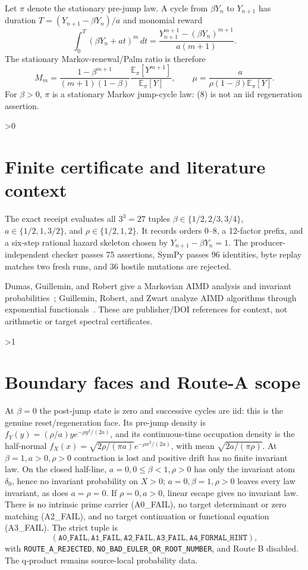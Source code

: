 \documentclass[10pt]{article}
\begin{document}
Let \(\pi\) denote the stationary pre-jump law.  A cycle from \(\beta Y_n\) to
\(Y_{n+1}\) has duration \(T=(Y_{n+1}-\beta Y_n)/a\) and monomial reward
\begin{equation}
 \int_0^T(\beta Y_n+at)^m\,dt
 =\frac{Y_{n+1}^{m+1}-(\beta Y_n)^{m+1}}{a(m+1)}. \tag{8}
\end{equation}
The stationary Markov-renewal/Palm ratio is therefore
\begin{equation}
 M_m=\frac{1-\beta^{m+1}}{(m+1)(1-\beta)}
 \frac{\mathbb E_\pi[Y^{m+1}]}{\mathbb E_\pi[Y]},
 \qquad
 \mu=\frac{a}{\rho(1-\beta)\mathbb E_\pi[Y]}. \tag{9}
\end{equation}
For \(\beta>0\), \(\pi\) is a stationary Markov jump-cycle law: (8) is not an
iid regeneration assertion.

\ifnum\CRevisionRound>0
\section{Finite certificate and literature context}
The exact receipt evaluates all \(3^3=27\) tuples
\(\beta\in\{1/2,2/3,3/4\}\), \(a\in\{1/2,1,3/2\}\), and
\(\rho\in\{1/2,1,2\}\).  It records orders 0--8, a 12-factor prefix, and a
six-step rational hazard skeleton chosen by \(Y_{n+1}-\beta Y_n=1\).  The
producer-independent checker passes 75 assertions, SymPy passes 96 identities,
byte replay matches two fresh runs, and 36 hostile mutations are rejected.

Dumas, Guillemin, and Robert give a Markovian AIMD analysis and invariant
probabilities~\cite{dumas2002}; Guillemin, Robert, and Zwart analyze AIMD
algorithms through exponential functionals~\cite{guillemin2004}.  These are
publisher/DOI references for context, not arithmetic or target spectral
certificates.
\fi

\ifnum\CRevisionRound>1
\section{Boundary faces and Route-A scope}
At \(\beta=0\) the post-jump state is zero and successive cycles are iid: this
is the genuine reset/regeneration face.  Its pre-jump density is
\(f_Y(y)=(\rho/a)y e^{-\rho y^2/(2a)}\), and its continuous-time occupation
density is the half-normal
\(f_X(x)=\sqrt{2\rho/(\pi a)}e^{-\rho x^2/(2a)}\), with mean
\(\sqrt{2a/(\pi\rho)}\).  At \(\beta=1,a>0,\rho>0\) contraction is lost and
positive drift has no finite invariant law.  On the closed half-line,
\(a=0,0\le\beta<1,\rho>0\) has only the invariant atom \(\delta_0\), hence no
invariant probability on \(X>0\); \(a=0,\beta=1,\rho>0\) leaves every law
invariant, as does \(a=\rho=0\).  If \(\rho=0,a>0\), linear escape gives no
invariant law.  There is no intrinsic prime carrier (A0\_FAIL),
no target determinant or zero matching (A2\_FAIL), and no target continuation
or functional equation (A3\_FAIL).  The strict tuple is
\[
(\mathtt{A0\_FAIL},\mathtt{A1\_FAIL},\mathtt{A2\_FAIL},\mathtt{A3\_FAIL},
 \mathtt{A4\_FORMAL\_HINT}),
\]
with \texttt{ROUTE\_A\_REJECTED}, \texttt{NO\_BAD\_EULER\_OR\_ROOT\_NUMBER},
and Route B disabled.  The q-product remains source-local probability data.
\fi
\end{document}
